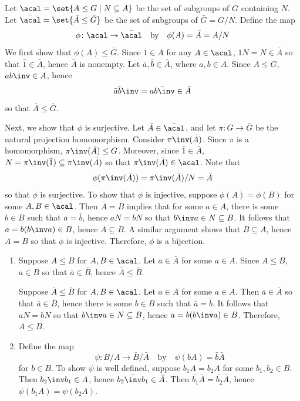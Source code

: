 \begin{sol}
    Let $\acal = \set{A \leq G \mid N \subseteq A}$ be the set of subgroups of $G$ containing $N$.
	Let $\bar{\acal} = \set{\bar A \leq \bar G}$ be the set of subgroups of $\bar G = G/N$.
	Define the map
    \[
    	\phi \colon \acal \to \bar{\acal} \quad \text{by} \quad \phi(A) = \bar A = A/N
    \]
    We first show that $\phi(A) \leq \bar G$.
	Since $1 \in A$ for any $A \in \acal$, $1N = N \in \bar A$ so that $\bar 1 \in \bar A$, hence $\bar A$ is nonempty.
	Let $\bar a, \bar b \in \bar A$, where $a, b \in A$.
	Since $A \leq G$, $ab\inv \in A$, hence
    \[
    	\bar a \bar b\inv = \bar{ab\inv} \in \bar A
    \]
    so that $\bar A \leq \bar G$.

    Next, we show that $\phi$ is surjective.
	Let $\bar A \in \bar{\acal}$, and let $\pi \colon G \to \bar G$ be the natural projection homomorphism.
	Consider $\pi\inv(\bar A)$.
	Since $\pi$ is a homomorphism, $\pi\inv(\bar A) \leq G$.
	Moreover, since $\bar 1 \in \bar A$, $N = \pi\inv(\bar 1) \subseteq \pi\inv(\bar A)$ so that $\pi\inv(\bar A) \in \acal$.
	Note that
    \[
    	\phi(\pi\inv(\bar A)) = \pi\inv(\bar A)/N = \bar A
    \]
    so that $\phi$ is surjective.
	To show that $\phi$ is injective, suppose $\phi(A) = \phi(B)$ for some $A, B \in \acal$.
	Then $\bar A = \bar B$ implies that for some $a \in A$, there is some $b \in B$ such that $\bar a = \bar b$, hence $aN = bN$ so that $b\inv a \in N \subseteq B$.
	It follows that $a = b(b\inv a) \in B$, hence $A \subseteq B$.
	A similar argument shows that $B \subseteq A$, hence $A = B$ so that $\phi$ is injective.
	Therefore, $\phi$ is a bijection.
    \begin{enumerate}
        \item \rightimp Suppose $A \leq B$ for $A, B \in \acal$.
        Let $\bar a \in \bar A$ for some $a \in A$.
        Since $A \leq B$, $a \in B$ so that $\bar a \in \bar B$, hence $\bar A \leq \bar B$.
        
        \leftimp Suppose $\bar A \leq \bar B$ for $A, B \in \acal$.
        Let $a \in A$ for some $a \in A$.
        Then $\bar a \in \bar A$ so that $\bar a \in \bar B$, hence there is some $b \in B$ such that $\bar a = \bar b$.
        It follows that $aN = bN$ so that $b\inv a \in N \subseteq B$, hence $a = b(b\inv a) \in B$.
        Therefore, $A \leq B$.
        \item Define the map
        \[
        	\psi \colon B/A \to \bar B / \bar A \quad \text{by} \quad \psi(bA) = \bar b \bar A
        \]
        for $b \in B$.
        To show $\psi$ is well defined, suppose $b_1A = b_2A$ for some $b_1, b_2 \in B$.
        Then $b_2\inv b_1 \in A$, hence $\bar{b_2\inv b_1} \in \bar A$.
        Then $\bar{b_1} \bar A = \bar{b_2} \bar A$, hence $\psi(b_1A) = \psi(b_2A)$.


\end{enumerate}
\end{sol}
